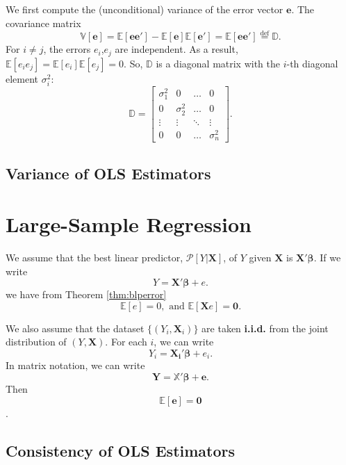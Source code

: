 \documentclass[
]{book}
\theoremstyle{definition}
\theoremstyle{definition}
\theoremstyle{definition}
\theoremstyle{definition}
\theoremstyle{remark}
\begin{document}
We first compute the (unconditional) variance of the error vector \(\pmb{e}\). The covariance matrix
\[
\mathbb{V}[\pmb{e}]={\mathbb{E}\left[ \pmb{e}\pmb{e}' \right]}-{\mathbb{E}\left[ \pmb{e} \right]}{\mathbb{E}\left[ \pmb{e}' \right]}={\mathbb{E}\left[ \pmb{e}\pmb{e}' \right]}\stackrel{\text{def}}{=}\mathbb{D}.
\]
For \(i\neq j\), the errors \(e_i\),\(e_j\) are independent. As a result, \({\mathbb{E}\left[ e_ie_j \right]}={\mathbb{E}\left[ e_i \right]}{\mathbb{E}\left[ e_j \right]}=0\). So, \(\mathbb{D}\) is a diagonal matrix with the \(i\)-th diagonal element \(\sigma_i^2\):
\[
\mathbb{D}=\begin{bmatrix}
\sigma_1^2 & 0 & \ldots & 0 \\
0 & \sigma_2^2 & \ldots & 0 \\
\vdots & \vdots & \ddots & \vdots \\
0 & 0 & \ldots & \sigma_n^2
\end{bmatrix}.
\]

\hypertarget{variance-of-ols-estimators}{%
\section{Variance of OLS Estimators}\label{variance-of-ols-estimators}}

\hypertarget{large-sample-regression}{%
\chapter{Large-Sample Regression}\label{large-sample-regression}}

We assume that the best linear predictor, \(\mathscr{P}[Y|\pmb{X}]\), of \(Y\) given \(\pmb{X}\) is \(\pmb{X}'\pmb{\beta}\). If we write
\[
Y=\pmb{X}'\pmb{\beta}+e.
\]
we have from Theorem \ref{thm:blperror}
\[{\mathbb{E}\left[ e \right]}=0,\mbox{ and }{\mathbb{E}\left[ \pmb{X}e \right]}=\pmb{0}.\]

We also assume that the dataset \(\{(Y_i,\pmb{X}_i)\}\) are taken \textbf{i.i.d.} from the joint distribution of \((Y,\pmb{X})\). For each \(i\), we can write
\[
Y_i=\pmb{X_i}'\pmb{\beta}+e_i.
\]
In matrix notation, we can write
\[
\pmb{Y}=\mathbb{X}'\pmb{\beta}+\pmb{e}.
\]
Then
\[{\mathbb{E}\left[ \pmb{e} \right]}=\pmb{0}\].

\hypertarget{consistency-of-ols-estimators}{%
\section{Consistency of OLS Estimators}\label{consistency-of-ols-estimators}}
\end{document}
